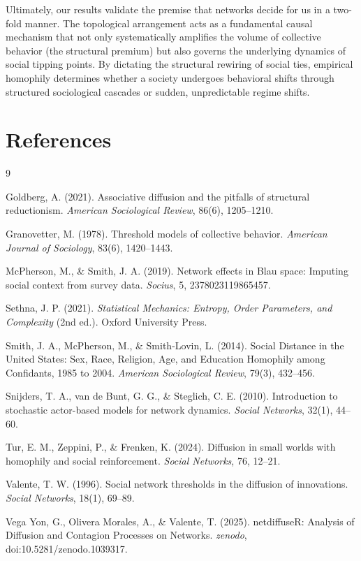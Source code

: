 \documentclass[12pt, a4paper]{article}
\begin{document}
Ultimately, our results validate the premise that networks decide for us in a two-fold manner. The topological arrangement acts as a fundamental causal mechanism that not only systematically amplifies the volume of collective behavior (the structural premium) but also governs the underlying dynamics of social tipping points. By dictating the structural rewiring of social ties, empirical homophily determines whether a society undergoes behavioral shifts through structured sociological cascades or sudden, unpredictable regime shifts.

\section*{References}
\begin{thebibliography}{9}

Goldberg, A. (2021). Associative diffusion and the pitfalls of structural reductionism. \textit{American Sociological Review}, 86(6), 1205--1210.

Granovetter, M. (1978). Threshold models of collective behavior. \textit{American Journal of Sociology}, 83(6), 1420--1443.

McPherson, M., \& Smith, J. A. (2019). Network effects in Blau space: Imputing social context from survey data. \textit{Socius}, 5, 2378023119865457.

Sethna, J. P. (2021). \textit{Statistical Mechanics: Entropy, Order Parameters, and Complexity} (2nd ed.). Oxford University Press.

Smith, J. A., McPherson, M., \& Smith-Lovin, L. (2014). Social Distance in the United States: Sex, Race, Religion, Age, and Education Homophily among Confidants, 1985 to 2004. \textit{American Sociological Review}, 79(3), 432--456.

Snijders, T. A., van de Bunt, G. G., \& Steglich, C. E. (2010). Introduction to stochastic actor-based models for network dynamics. \textit{Social Networks}, 32(1), 44--60.

Tur, E. M., Zeppini, P., \& Frenken, K. (2024). Diffusion in small worlds with homophily and social reinforcement. \textit{Social Networks}, 76, 12--21.

Valente, T. W. (1996). Social network thresholds in the diffusion of innovations. \textit{Social Networks}, 18(1), 69--89.

Vega Yon, G., Olivera Morales, A., \& Valente, T. (2025). netdiffuseR: Analysis of Diffusion and Contagion Processes on Networks. \textit{zenodo}, doi:10.5281/zenodo.1039317.

\end{thebibliography}
\end{document}
